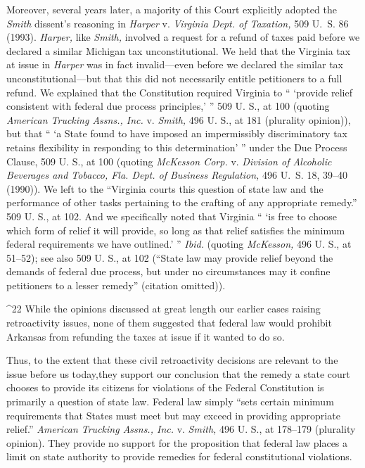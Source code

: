 {{{{  Moreover, several years later, a majority of this Court explicitly
adopted the \emph{Smith} dissent's reasoning in \emph{Harper} v.
\emph{Virginia Dept. of Taxation,} 509 U.~S. 86 (1993). \emph{Harper,}
like \emph{Smith,} involved a request for a refund of taxes paid before
we declared a similar Michigan tax unconstitutional. We held that the
Virginia tax at issue in \emph{Harper} was in fact invalid---even before
we declared the similar tax unconstitutional---but that this did not
necessarily entitle petitioners to a full refund. We explained that the
Constitution required Virginia to `` ‘provide relief consistent with
federal due process principles,' '' 509 U. S., at 100 (quoting
\emph{American Trucking Assns., Inc.} v. \emph{Smith,} 496 U. S., at 181
(plurality opinion)), but that `` ‘a State found to have imposed
an impermissibly discriminatory tax retains flexibility in responding
to this determination' '' under the Due Process Clause, 509 U. S.,
at 100 (quoting \emph{McKesson Corp.} v. \emph{Division of Alcoholic Beverages
and Tobacco, Fla. Dept. of Business Regulation,} 496 U.~S. 18, 39--40
(1990)). We left to the ``Virginia courts this question of state
law and the performance of other tasks pertaining to the crafting of
any appropriate remedy.'' 509 U. S., at 102. And we specifically
noted that Virginia `` ‘is free to choose which form of relief it
will provide, so long as that relief satisfies the minimum federal
requirements we have outlined.' '' \emph{Ibid.} (quoting \emph{McKesson,}
496 U. S., at 51--52); see also 509 U. S., at 102 (``State law may
provide relief beyond the demands of federal due process, but under no
circumstances may it confine petitioners to a lesser remedy'' (citation
omitted)).\newpage 

^22 While the opinions discussed at great length our earlier cases
raising retroactivity issues, none of them suggested that federal law
would prohibit Arkansas from refunding the taxes at issue if it wanted
to do so.

  Thus, to the extent that these civil retroactivity decisions are
relevant to the issue before us today,\footnotemark[23] they support our conclusion
that the remedy a state court chooses to provide its citizens for
violations of the Federal Constitution is primarily a question of state
law. Federal law simply ``sets certain minimum requirements that
States must meet but may exceed in providing appropriate relief.''
\emph{American Trucking Assns., Inc.} v. \emph{Smith,} 496 U. S., at
178--179 (plurality opinion). They provide no support for the
proposition that federal law places a limit on state authority to
provide remedies for federal constitutional violations.

}}}}
